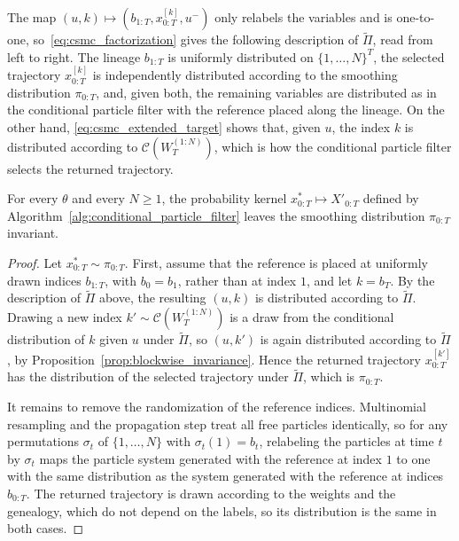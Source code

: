 The map $(u,k)\mapsto(b_{1:T},x_{0:T}^{[k]},u^-)$ only relabels the variables and is one-to-one, so~\eqref{eq:csmc_factorization} gives the following description of $\tilde{\Pi}$, read from left to right. The lineage $b_{1:T}$ is uniformly distributed on $\{1,\ldots,N\}^T$, the selected trajectory $x_{0:T}^{[k]}$ is independently distributed according to the smoothing distribution $\pi_{0:T}$, and, given both, the remaining variables are distributed as in the conditional particle filter with the reference placed along the lineage. On the other hand, \eqref{eq:csmc_extended_target} shows that, given $u$, the index $k$ is distributed according to $\mathcal{C}(W_T^{(1:N)})$, which is how the conditional particle filter selects the returned trajectory.

\begin{theorem}
    \label{thm:csmc_invariance}
    For every $\theta$ and every $N\ge1$, the probability kernel $x_{0:T}^*\mapsto X'_{0:T}$ defined by Algorithm~\ref{alg:conditional_particle_filter} leaves the smoothing distribution $\pi_{0:T}$ invariant.
\end{theorem}
\begin{proof}
    Let $x_{0:T}^*\sim\pi_{0:T}$. First, assume that the reference is placed at uniformly drawn indices $b_{1:T}$, with $b_0 = b_1$, rather than at index $1$, and let $k = b_T$. By the description of $\tilde{\Pi}$ above, the resulting $(u,k)$ is distributed according to $\tilde{\Pi}$. Drawing a new index $k'\sim\mathcal{C}(W_T^{(1:N)})$ is a draw from the conditional distribution of $k$ given $u$ under $\tilde{\Pi}$, so $(u,k')$ is again distributed according to $\tilde{\Pi}$, by Proposition~\ref{prop:blockwise_invariance}. Hence the returned trajectory $x_{0:T}^{[k']}$ has the distribution of the selected trajectory under $\tilde{\Pi}$, which is $\pi_{0:T}$.

    It remains to remove the randomization of the reference indices. Multinomial resampling and the propagation step treat all free particles identically, so for any permutations $\sigma_t$ of $\{1,\ldots,N\}$ with $\sigma_t(1) = b_t$, relabeling the particles at time $t$ by $\sigma_t$ maps the particle system generated with the reference at index $1$ to one with the same distribution as the system generated with the reference at indices $b_{0:T}$. The returned trajectory is drawn according to the weights and the genealogy, which do not depend on the labels, so its distribution is the same in both cases.
\end{proof}

